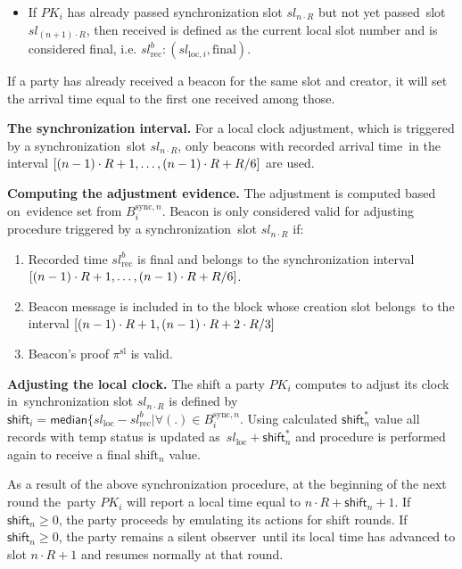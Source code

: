 \begin{legal}
\begin{itemize}
        \item If $PK_i$ has already passed synchronization slot $sl_{n \cdot R}$ but not yet passed\
        slot $sl_{(n + 1) \cdot R}$, then received is defined as the current local slot number and is considered final,
        i.e. ${sl^b_{\text{rec}}: (sl_{\text{loc}, i}, \text{final})}$.
    \end{itemize}
    If a party has already received a beacon for the same slot and creator, it will set the arrival time equal to
    the ﬁrst one received among those.
    \item[]\textbf{The synchronization interval.} For a local clock adjustment, which is triggered by a synchronization\
    slot $sl_{n \cdot R}$, only beacons with recorded arrival time\
    in the interval ${[(n - 1) \cdot R + 1,\dots,(n-1) \cdot R + R \// 6]}$ are used.
    \item[]\textbf{Computing the adjustment evidence.} The adjustment is computed based on\
    evidence set from $B_i^{\text{sync}, n}$.
    Beacon is only considered valid for adjusting procedure triggered by a synchronization\
    slot $sl_{n \cdot R}$ if:
    \begin{enumerate}
        \item Recorded time $sl^b_{\text{rec}}$ is final and belongs to the synchronization interval\
        ${[(n - 1) \cdot R + 1,\dots,(n-1) \cdot R + R \// 6]}$.
        \item Beacon message is included in to the block whose creation slot belongs\
        to the interval ${[(n - 1) \cdot R + 1, (n - 1) \cdot R + 2 \cdot R \// 3]}$
        \item Beacon's proof $\pi^{\text{sl}}$ is valid.
    \end{enumerate}
    \item[]\textbf{Adjusting the local clock.} The shift a party $PK_i$ computes to adjust its clock in\
    synchronization slot $sl_{n \cdot R}$ is defined by\
    ${\textsf{shift}_i = \textsf{median} \{sl_{\text{loc}} - sl^b_{\text{rec}} | \forall (.) \in B_i^{\text{sync}, n}}$.
    Using calculated ${\textsf{shift}^*_n}$ value all records with $\text{temp}$ status is updated as\
    ${sl_{\text{loc}} + \textsf{shift}^*_n}$ and procedure is performed again to receive a final $\text{shift}_n$ value.
\end{legal}


As a result of the above synchronization procedure, at the beginning of the next round the\
party $PK_i$ will report a local time equal to $n \cdot R + \textsf{shift}_n + 1$.
If ${\textsf{shift}_n \geq 0}$, the party proceeds by emulating its actions for shift rounds.
If ${\textsf{shift}_n \geq 0}$, the party remains a silent observer\
until its local time has advanced to slot $n \cdot R + 1$ and resumes normally at that round.